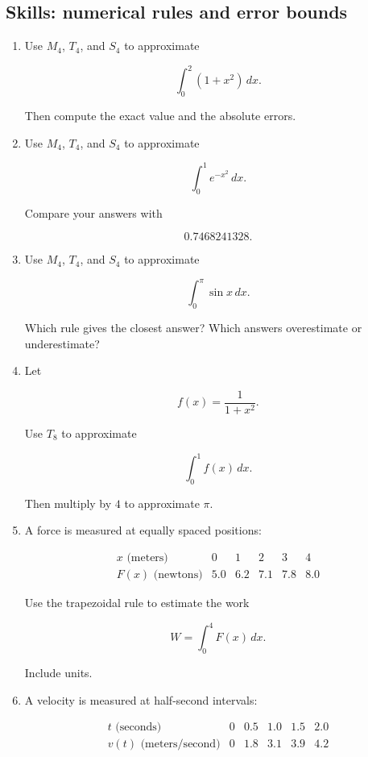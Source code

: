 \subsection{Skills: numerical rules and error bounds}
\label{subsec:chapter-12-skills-problems}

\begin{enumerate}
\item Use \(M_4\), \(T_4\), and \(S_4\) to approximate

\[
\int_0^2 (1+x^2)\,dx.
\]

Then compute the exact value and the absolute errors.

\item Use \(M_4\), \(T_4\), and \(S_4\) to approximate

\[
\int_0^1 e^{-x^2}\,dx.
\]

Compare your answers with

\[
0.7468241328.
\]

\item Use \(M_4\), \(T_4\), and \(S_4\) to approximate

\[
\int_0^\pi \sin x\,dx.
\]

Which rule gives the closest answer?  Which answers overestimate or underestimate?

\item Let

\[
f(x)=\frac{1}{1+x^2}.
\]

Use \(T_8\) to approximate

\[
\int_0^1 f(x)\,dx.
\]

Then multiply by \(4\) to approximate \(\pi\).

\item A force is measured at equally spaced positions:

\[
\begin{array}{c|ccccc}
x\text{ (meters)} & 0 & 1 & 2 & 3 & 4 \\ \hline
F(x)\text{ (newtons)} & 5.0 & 6.2 & 7.1 & 7.8 & 8.0
\end{array}
\]

Use the trapezoidal rule to estimate the work

\[
W=\int_0^4 F(x)\,dx.
\]

Include units.

\item A velocity is measured at half-second intervals:

\[
\begin{array}{c|ccccc}
t\text{ (seconds)} & 0 & 0.5 & 1.0 & 1.5 & 2.0 \\ \hline
v(t)\text{ (meters/second)} & 0 & 1.8 & 3.1 & 3.9 & 4.2
\end{array}
\]


\end{enumerate}
